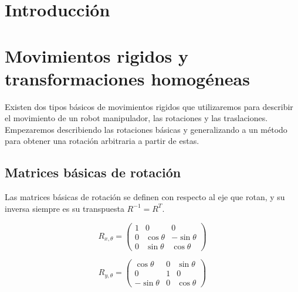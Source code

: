\begin{multicols*}{2}


    \section{Introducción}


    \section{Movimientos rigidos y transformaciones homogéneas}

        Existen dos tipos básicos de movimientos rigidos que utilizaremos para describir el movimiento de un robot manipulador, las rotaciones y las traslaciones. Empezaremos describiendo las rotaciones básicas y generalizando a un método para obtener una rotación arbitraria a partir de estas.


        \subsection{Matrices básicas de rotación}

            Las matrices básicas de rotación se definen con respecto al eje que rotan, y su inversa siempre es su transpuesta $R^{-1} = R^T$.

            \begin{equation}
                R_{x, \theta} = 
                \begin{pmatrix}
                    1 & 0 & 0 \\
                    0 & \cos{\theta} & -\sin{\theta} \\
                    0 & \sin{\theta} & \cos{\theta}
                \end{pmatrix}
            \end{equation}

            \begin{equation}
                R_{y, \theta} = 
                \begin{pmatrix}
                    \cos{\theta} & 0 & \sin{\theta} \\
                    0 & 1 & 0 \\
                    -\sin{\theta} & 0 & \cos{\theta}
                \end{pmatrix}
            \end{equation}


\end{multicols*}
